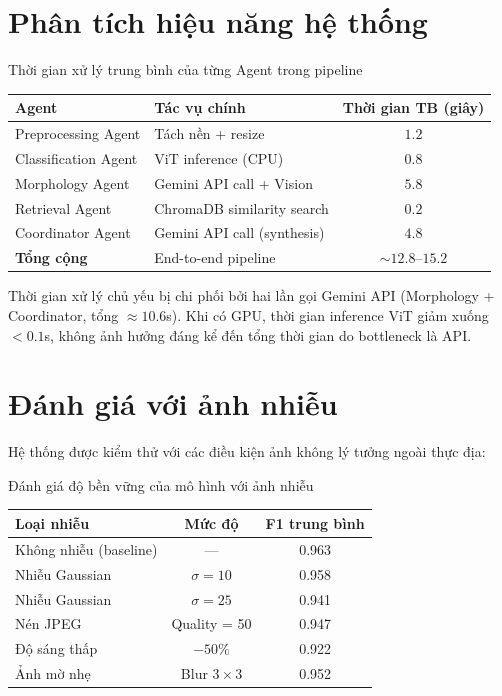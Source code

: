 \section{Phân tích hiệu năng hệ thống}
\begin{table}[H]{Thời gian xử lý trung bình của từng Agent trong pipeline}
\centering
\begin{tabular}{llc}
\toprule
\textbf{Agent} & \textbf{Tác vụ chính} & \textbf{Thời gian TB (giây)} \\
\midrule
Preprocessing Agent  & Tách nền + resize           & $1.2$ \\
Classification Agent & ViT inference (CPU)         & $0.8$ \\
Morphology Agent     & Gemini API call + Vision    & $5.8$ \\
Retrieval Agent      & ChromaDB similarity search  & $0.2$ \\
Coordinator Agent    & Gemini API call (synthesis) & $4.8$ \\
\midrule
\textbf{Tổng cộng}   & End-to-end pipeline         & $\sim 12.8$--$15.2$ \\
\bottomrule
\end{tabular}
\end{table}

Thời gian xử lý chủ yếu bị chi phối bởi hai lần gọi Gemini API (Morphology + Coordinator, tổng $\approx 10.6$s). Khi có GPU, thời gian inference ViT giảm xuống $< 0.1$s, không ảnh hưởng đáng kể đến tổng thời gian do bottleneck là API.

\section{Đánh giá với ảnh nhiễu}
Hệ thống được kiểm thử với các điều kiện ảnh không lý tưởng ngoài thực địa:

\begin{table}[H]{Đánh giá độ bền vững của mô hình với ảnh nhiễu}
\centering
\begin{tabular}{lcc}
\toprule
\textbf{Loại nhiễu} & \textbf{Mức độ} & \textbf{F1 trung bình} \\
\midrule
Không nhiễu (baseline) & --- & 0.963 \\
Nhiễu Gaussian  & $\sigma = 10$ & 0.958 \\
Nhiễu Gaussian  & $\sigma = 25$ & 0.941 \\
Nén JPEG        & Quality = 50  & 0.947 \\
Độ sáng thấp    & $-50\%$       & 0.922 \\
Ảnh mờ nhẹ      & Blur $3\times3$ & 0.952 \\
\bottomrule
\end{tabular}
\end{table}

